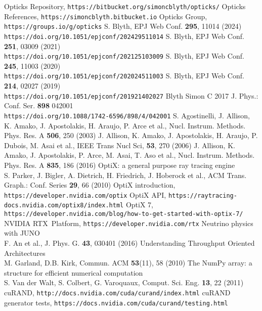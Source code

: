 \documentclass{webofc}
\begin{document}
\begin{thebibliography}{}
%
Opticks Repository, {\tt https://bitbucket.org/simoncblyth/opticks/}
Opticks References, {\tt https://simoncblyth.bitbucket.io}
Opticks Group, {\tt https://groups.io/g/opticks}
S. Blyth, EPJ Web Conf. {\bf 295}, 11014 (2024) \\
{\tt https://doi.org/10.1051/epjconf/202429511014}
S. Blyth, EPJ Web Conf. {\bf 251}, 03009 (2021) \\
{\tt https://doi.org/10.1051/epjconf/202125103009}
S. Blyth, EPJ Web Conf. {\bf 245}, 11003 (2020) \\
{\tt https://doi.org/10.1051/epjconf/202024511003}
S. Blyth, EPJ Web Conf. {\bf 214}, 02027 (2019) \\
{\tt https://doi.org/10.1051/epjconf/201921402027}
Blyth Simon C 2017 J. Phys.: Conf. Ser. {\bf 898} 042001 \\
{\tt https://doi.org/10.1088/1742-6596/898/4/042001}
%
S. Agostinelli, J. Allison, K. Amako, J. Apostolakis, H. Araujo, P. Arce et al., Nucl. Instrum. Methods. Phys. Res. A {\bf 506}, 250 (2003)
J. Allison, K. Amako, J. Apostolakis, H. Araujo, P. Dubois, M. Asai et al., IEEE Trans Nucl Sci, {\bf 53}, 270 (2006)
J. Allison, K. Amako, J. Apostolakis, P. Arce, M. Asai, T. Aso et al., Nucl. Instrum. Methods. Phys. Res. A {\bf 835}, 186 (2016)
%
%
OptiX: a general purpose ray tracing engine \\
S. Parker, J. Bigler, A. Dietrich, H. Friedrich, J. Hoberock et al., ACM Trans. Graph.: Conf. Series {\bf 29}, 66 (2010)
OptiX introduction, {\tt https://developer.nvidia.com/optix}
OptiX API, {\tt https://raytracing-docs.nvidia.com/optix8/index.html}
OptiX 7, {\tt https://developer.nvidia.com/blog/how-to-get-started-with-optix-7/}
NVIDIA RTX\texttrademark\, Platform, {\tt https://developer.nvidia.com/rtx}
Neutrino physics with JUNO \\
F. An et al., J. Phys. G. {\bf 43}, 030401 (2016) 
Understanding Throughput Oriented Architectures \\
M. Garland, D.B. Kirk, Commun. ACM {\bf 53}(11), 58 (2010) 
The NumPy array: a structure for efficient numerical computation \\
S. Van der Walt, S. Colbert, G. Varoquaux, Comput. Sci. Eng. {\bf 13}, 22 (2011)
cuRAND, {\tt http://docs.nvidia.com/cuda/curand/index.html}
cuRAND generator tests, {\tt https://docs.nvidia.com/cuda/curand/testing.html}
\end{thebibliography}
%
\end{document}
